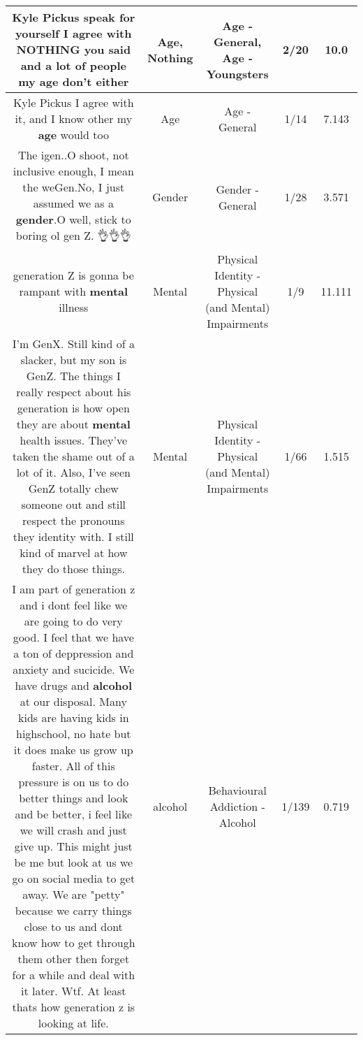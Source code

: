 \documentclass[11pt]{article}
\newlength\mylength
\begin{document}
\begin{center}
\begin{longtable}{|C{.65\mylength}|C{.30\mylength}|C{.12\mylength}|C{.12\mylength}|C{.12\mylength}|}
  \small Kyle Pickus speak for yourself I agree with \textbf{NOTHING} you said and a lot of people my \textbf{age} don't either\normalsize   & Age, Nothing & Age - General, Age - Youngsters & 2/20 & 10.0 \\  \hline
  \small Kyle Pickus I agree with it, and I know other my \textbf{age} would too\normalsize   & Age & Age - General & 1/14 & 7.143 \\  \hline
  \small The igen..O shoot, not inclusive enough, I mean the weGen.No, I just assumed we as a \textbf{gender}.O well, stick to boring ol gen Z. 👌👌👌\normalsize   & Gender & Gender - General & 1/28 & 3.571 \\  \hline
  \small generation Z is gonna be rampant with \textbf{mental} illness\normalsize   & Mental & Physical Identity - Physical (and Mental) Impairments & 1/9 & 11.111 \\  \hline
  \small I'm GenX. Still kind of a slacker, but my son is GenZ. The things I really respect about his generation is how open they are about \textbf{mental} health issues. They've taken the shame out of a lot of it.  Also,  I've seen GenZ totally chew someone out and still respect the pronouns they identity with. I still kind of marvel at how they do those things.\normalsize   & Mental & Physical Identity - Physical (and Mental) Impairments & 1/66 & 1.515 \\  \hline
  \small I am part of generation z and i dont feel like we are going to do very good. I feel that we have a ton of deppression and anxiety and sucicide. We have drugs and \textbf{alcohol} at our disposal. Many kids are having kids in highschool, no hate but it does make us grow up faster. All of this pressure is on us to do better things and look and be better, i feel like we will crash and just give up. This might just be me but look at us we go on social media to get away. We are "petty" because we carry things close to us and dont know how to get through them other then forget for a while and deal with it later. Wtf. At least thats how generation z is looking at life.\normalsize   & alcohol & Behavioural Addiction - Alcohol & 1/139 & 0.719 \\  \hline

\end{longtable}
\end{center}
\end{document}
